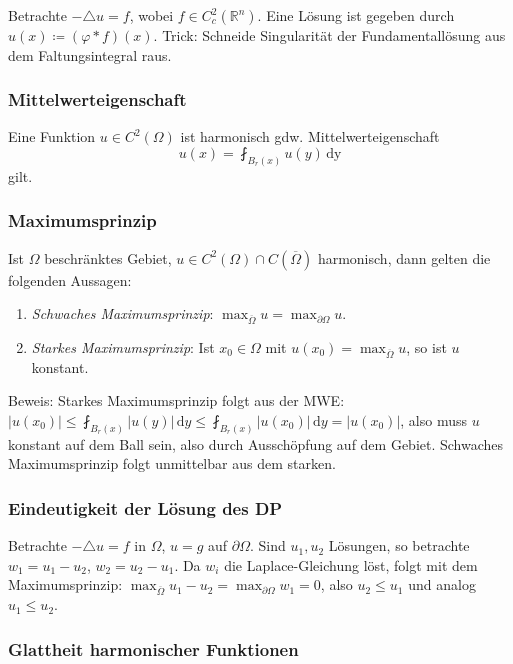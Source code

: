 \documentclass[11pt,a4paper]{scrartcl}
\newcommand{\R}{\mathbb{R}} %
\newcommand{\laplace}{\triangle}
\theoremstyle{plain}
\theoremstyle{definition}
\theoremstyle{remark}
\begin{document}
Betrachte $-\laplace u = f$, wobei $f\in C_c^2(\R^n)$. Eine Lösung ist gegeben durch $u(x)\coloneqq (\varphi * f)(x)$. Trick: Schneide Singularität der Fundamentallösung aus dem Faltungsintegral raus.

\subsubsection{Mittelwerteigenschaft}

Eine Funktion  $u\in C^2(\Omega)$ ist harmonisch gdw. Mittelwerteigenschaft $$u(x) = \fint_{B_r(x)} u(y) \, \mathrm{dy}$$ gilt.

\subsubsection{Maximumsprinzip}

Ist $\Omega$ beschränktes Gebiet, $u\in C^2(\Omega) \cap C(\overline{\Omega})$ harmonisch, dann gelten die folgenden Aussagen:

\begin{enumerate}
    \item \emph{Schwaches Maximumsprinzip}: $\max_{\overline{\Omega}} u = \max_{\partial \Omega} u$.
    \item \emph{Starkes Maximumsprinzip}: Ist $x_0 \in \Omega$ mit $u(x_0) = \max_{\overline{\Omega}} u$, so ist $u$ konstant.
\end{enumerate}

Beweis: Starkes Maximumsprinzip folgt aus der MWE: $|u(x_0)| \leq \fint_{B_r(x)} |u(y)| \, \mathrm{d}y \leq \fint_{B_r(x)} |u(x_0)| \, \mathrm{d}y = |u(x_0)|$, also muss $u$ konstant auf dem Ball sein, also durch Ausschöpfung auf dem Gebiet. Schwaches Maximumsprinzip folgt unmittelbar aus dem starken.

\subsubsection{Eindeutigkeit der Lösung des DP}

Betrachte $-\laplace u = f$ in $\Omega$, $u=g$ auf $\partial \Omega$. Sind $u_1,u_2$ Lösungen, so betrachte $w_1=u_1-u_2$, $w_2=u_2-u_1$. Da $w_i$ die Laplace-Gleichung löst, folgt mit dem Maximumsprinzip: $\max_{\overline{\Omega}} u_1-u_2 = \max_{\partial \Omega} w_1 = 0$, also $u_2\leq u_1$ und analog $u_1\leq u_2$.

\subsubsection{Glattheit harmonischer Funktionen}
\end{document}
